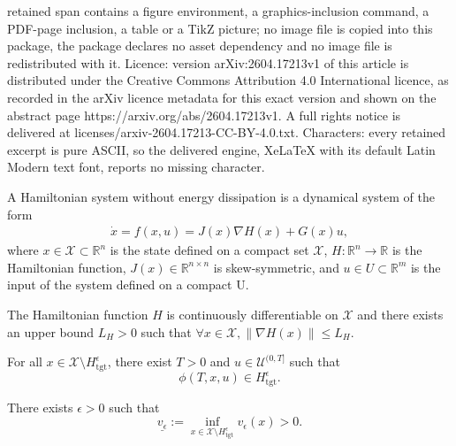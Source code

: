 \documentclass[10pt,a4paper]{amsart}
\newcommand{\R}{\mathbb{R}}
\newcommand{\X}{\mathcal{X}}
\newcommand{\tgt}{\mathrm{tgt}}
\begin{document}
retained span contains a figure environment, a graphics-inclusion command, a PDF-page inclusion, a table or a TikZ picture; no image file is copied into this package, the package declares no asset dependency and no image file is redistributed with it. Licence: version arXiv:2604.17213v1 of this article is distributed under the Creative Commons Attribution 4.0 International licence, as recorded in the arXiv licence metadata for this exact version and shown on the abstract page https://arxiv.org/abs/2604.17213v1. A full rights notice is delivered at licenses/arxiv-2604.17213-CC-BY-4.0.txt. Characters: every retained excerpt is pure ASCII, so the delivered engine, XeLaTeX with its default Latin Modern text font, reports no missing character.
\begin{definition}
A Hamiltonian system without energy dissipation is a dynamical system of the form
\begin{align}
\label{eq:Hamil_sys}
    \dot{x} = f(x,u) = J(x)\nabla H(x) + G(x)u,
\end{align}
where $x \in \X \subset \R^n$ is the state defined on a compact set $\X$, $H:\R^n \to \R$ is the Hamiltonian function, $J(x)\in\R^{n\times n}$ is skew-symmetric, and $u\in U\subset \R^m$ is the input of the system defined on a compact U.
\end{definition}

\begin{assumption}
\label{ass:bounded_gradient}
The Hamiltonian function $H$ is continuously differentiable on $\X$ and there exists an upper bound $L_H > 0$ such that $\forall x\in\X, \|\nabla H(x)\|\le L_H$.
\end{assumption}

\begin{assumption}[Reachability of $H_{\tgt}^\epsilon$]
\label{ass_reachability_of_the_target_set}
For all $x \in \mathcal{X} \setminus H_{\tgt}^\epsilon$, there exist $T > 0$ and $u \in \mathcal{U}^{(0,T]}$ such that
\[
\phi(T,x,u) \in H_{\tgt}^\epsilon.
\]
\end{assumption}

\begin{assumption}
\label{ass_lowest_speed}
There exists $\epsilon>0$ such that
\[
\underline{v_\epsilon} := \inf_{x\in \mathcal{X}\setminus H_{\tgt}^\epsilon} v_\epsilon(x) > 0.
\]
\end{assumption}
\end{document}
